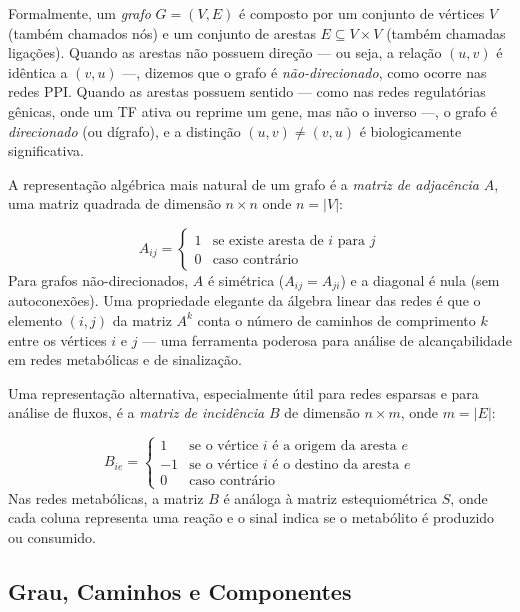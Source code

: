 Formalmente, um \emph{grafo} $G = (V, E)$ é composto por um conjunto de vértices $V$
(também chamados nós) e um conjunto de arestas $E \subseteq V \times V$ (também chamadas
ligações). Quando as arestas não possuem direção --- ou seja, a relação $(u, v)$ é
idêntica a $(v, u)$ ---, dizemos que o grafo é \emph{não-direcionado}, como ocorre nas redes
PPI. Quando as arestas possuem sentido --- como nas redes regulatórias gênicas, onde um TF
ativa ou reprime um gene, mas não o inverso ---, o grafo é \emph{direcionado} (ou dígrafo),
e a distinção $(u, v) \neq (v, u)$ é biologicamente significativa.

A representação algébrica mais natural de um grafo é a \emph{matriz de adjacência} $A$,
uma matriz quadrada de dimensão $n \times n$ onde $n = |V|$:

\begin{equation}
A_{ij} = \begin{cases}
1 & \text{se existe aresta de } i \text{ para } j \\
0 & \text{caso contrário}
\end{cases}
\end{equation}
Para grafos não-direcionados, $A$ é simétrica ($A_{ij} = A_{ji}$) e a diagonal é nula
(sem autoconexões). Uma propriedade elegante da álgebra linear das redes é que o elemento
$(i,j)$ da matriz $A^k$ conta o número de caminhos de comprimento $k$ entre os vértices
$i$ e $j$ --- uma ferramenta poderosa para análise de alcançabilidade em redes metabólicas
e de sinalização.

Uma representação alternativa, especialmente útil para redes esparsas e para análise de
fluxos, é a \emph{matriz de incidência} $B$ de dimensão $n \times m$, onde $m = |E|$:

\begin{equation}
B_{ie} = \begin{cases}
1 & \text{se o vértice } i \text{ é a origem da aresta } e \\
-1 & \text{se o vértice } i \text{ é o destino da aresta } e \\
0 & \text{caso contrário}
\end{cases}
\end{equation}
Nas redes metabólicas, a matriz $B$ é análoga à matriz estequiométrica $S$, onde cada
coluna representa uma reação e o sinal indica se o metabólito é produzido ou consumido.

\subsection{Grau, Caminhos e Componentes}

